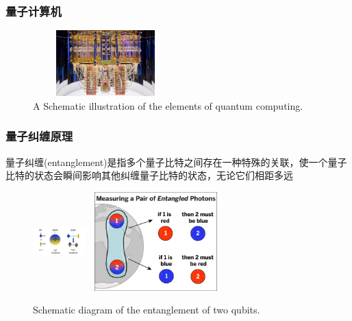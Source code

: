\begin{frame}
	\frametitle{量子计算机}
            \begin{figure}
        \centering
                \includegraphics[height=1.0in, width=2.2in, viewport=0 0 1200 515,clip]{Figures/Quantum_Computing.jpg}
		\caption{\tiny{\textrm{A Schematic illustration of the elements of quantum computing.}}}
		\label{Fig:Quantum_Computing}
            \end{figure}
\end{frame}

\begin{frame}
    \frametitle{量子纠缠原理}
    量子纠缠\textrm{(entanglement)}是指多个量子比特之间存在一种特殊的关联，使一个量子比特的状态会瞬间影响其他纠缠量子比特的状态，无论它们相距多远
            \begin{figure}
        \centering
                \includegraphics[height=1.5in, width=0.8in, viewport=460 0 645 380,clip]{Figures/Illustration-of-a-bit_and_qubit.png}
                \includegraphics[height=1.5in, width=2.05in, viewport=0 0 980 775,clip]{Figures/Quantum_Entanglement_chart.png}
		\caption{\tiny{\textrm{Schematic diagram of the entanglement of two qubits.}}}
		\label{Fig:Illustration-of-a-qubit-entanglement}
            \end{figure}
	    \vskip -10pt
	    {\fontsize{7.5pt}{5.2pt}\selectfont{利用量子纠缠可以实现高效的信息传输和处理，是量子通信和量子计算的重要资源}}
\end{frame}

